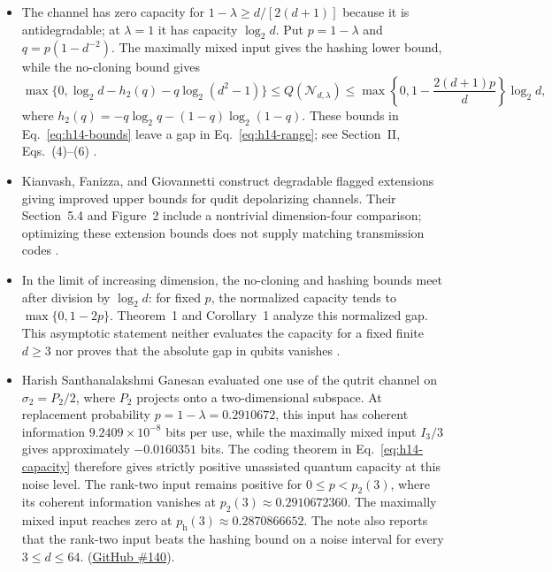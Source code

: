 \begin{itemize}
  \item The channel has zero capacity for $1-\lambda\geq d/[2(d+1)]$ because it is antidegradable; at $\lambda=1$ it has capacity $\log_2 d$. Put $p=1-\lambda$ and $q=p(1-d^{-2})$. The maximally mixed input gives the hashing lower bound, while the no-cloning bound gives
\begin{equation}
 \max\{0,\log_2 d-h_2(q)-q\log_2(d^2-1)\}\leq Q(\mathcal N_{d,\lambda})\leq\max\!\left\{0,1-\frac{2(d+1)p}{d}\right\}\log_2 d,
 \label{eq:h14-bounds}
\end{equation}
where $h_2(q)=-q\log_2q-(1-q)\log_2(1-q)$. These bounds in Eq.~\eqref{eq:h14-bounds} leave a gap in Eq.~\eqref{eq:h14-range}; see Section~II, Eqs.~(4)--(6) .

  \item Kianvash, Fanizza, and Giovannetti construct degradable flagged extensions giving improved upper bounds for qudit depolarizing channels. Their Section~5.4 and Figure~2 include a nontrivial dimension-four comparison; optimizing these extension bounds does not supply matching transmission codes .

  \item In the limit of increasing dimension, the no-cloning and hashing bounds meet after division by $\log_2 d$: for fixed $p$, the normalized capacity tends to $\max\{0,1-2p\}$. Theorem~1 and Corollary~1 analyze this normalized gap. This asymptotic statement neither evaluates the capacity for a fixed finite $d\geq3$ nor proves that the absolute gap in qubits vanishes .

  \item Harish Santhanalakshmi Ganesan evaluated one use of the qutrit channel on $\sigma_2=P_2/2$, where $P_2$ projects onto a two-dimensional subspace. At replacement probability $p=1-\lambda=0.2910672$, this input has coherent information $9.2409\times10^{-8}$ bits per use, while the maximally mixed input $I_3/3$ gives approximately $-0.0160351$ bits. The coding theorem in Eq.~\eqref{eq:h14-capacity} therefore gives strictly positive unassisted quantum capacity at this noise level. The rank-two input remains positive for $0\leq p<p_2(3)$, where its coherent information vanishes at $p_2(3)\approx0.2910672360$. The maximally mixed input reaches zero at $p_{\mathrm h}(3)\approx0.2870866652$. The note also reports that the rank-two input beats the hashing bound on a noise interval for every $3\leq d\leq64$.  (\href{https://github.com/Naixu-Guo/quantum-open-problems/issues/140}{GitHub \#140}).
\end{itemize}


